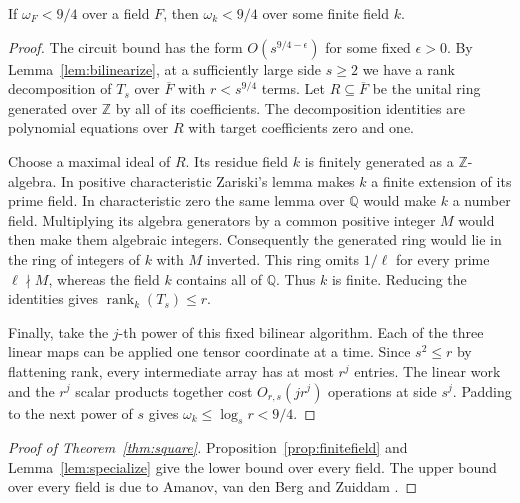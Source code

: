 \begin{lemma}\label{lem:specialize}
If \(\omega_F<9/4\) over a field \(F\), then \(\omega_k<9/4\)
over some finite field \(k\).
\end{lemma}
\begin{proof}
The circuit bound has the form \(O(s^{9/4-\epsilon})\) for some fixed
\(\epsilon>0\). By Lemma~\ref{lem:bilinearize}, at a sufficiently large
side \(s\ge2\) we have a rank decomposition of \(T_s\) over \(\overline F\)
with \(r<s^{9/4}\) terms. Let
\(R\subseteq\overline F\) be the unital ring generated over \(\mathbb Z\)
by all of its coefficients. The decomposition identities are polynomial
equations over \(R\) with target coefficients zero and one.

Choose a maximal ideal of \(R\). Its residue field \(k\) is finitely
generated as a \(\mathbb Z\)-algebra. In positive characteristic Zariski's
lemma makes \(k\) a finite extension of its prime field. In characteristic
zero the same lemma over \(\mathbb Q\) would make \(k\) a number field.
Multiplying its algebra generators by a common positive integer \(M\)
would then make them algebraic integers. Consequently the generated
ring would lie in the ring of integers of \(k\) with \(M\) inverted.
This ring omits \(1/\ell\) for every prime \(\ell\nmid M\), whereas
the field \(k\) contains all of \(\mathbb Q\). Thus \(k\) is finite.
Reducing the identities gives \(\operatorname{rank}_k(T_s)\le r\).

Finally, take the \(j\)-th power of this fixed bilinear algorithm.
Each of the three linear maps can be applied one tensor coordinate at
a time. Since \(s^2\le r\) by flattening rank, every intermediate
array has at most \(r^j\) entries. The linear work and the \(r^j\)
scalar products together cost \(O_{r,s}(j r^j)\) operations at side
\(s^j\). Padding to the next power of \(s\) gives
\(\omega_k\le\log_s r<9/4\).
\end{proof}

\begin{proof}[Proof of Theorem~\ref{thm:square}]
Proposition~\ref{prop:finitefield} and Lemma~\ref{lem:specialize} give
the lower bound over every field. The upper bound over every field is
due to Amanov, van den Berg and Zuiddam \citep{abvz}.
\end{proof}
